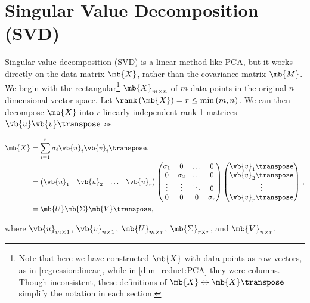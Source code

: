 \section{Singular Value Decomposition (SVD)}
\label{dim_reduct:SVD}

Singular value decomposition (SVD) is a linear method like PCA,
but it works directly on the data matrix $\mb{X}$,
rather than the covariance matrix $\mb{M}$.
We begin with the rectangular\footnote{Note that here we have constructed $\mb{X}$
with data points as row vectors, as in \cref{regression:linear},
while in \cref{dim_reduct:PCA} they were columns.
Though inconsistent, these definitions of $\mb{X} \leftrightarrow \mb{X}\transpose$
simplify the notation in each section.} $\mb{X}_{m \times n}$
of $m$ data points in the original $n$ dimensional vector space.
Let $\rank\left(\mb{X}\right) = r \leq \min\left(m,n\right)$.
We can then decompose $\mb{X}$ into $r$ linearly independent
rank 1 matrices $\vb{u} \vb{v}\transpose$ as

\begin{subequations}\label{eq:SVD}
\begin{align}
\mb{X} &= \sum_{i=1}^{r} \sigma_{i} \vb{u}_{i} \vb{v}_{i}\transpose, \label{eq:SVD:sum} \\
&= \begin{pmatrix}
  \vb{u}_{1} & \vb{u}_{2} & \ldots & \vb{u}_{r}
\end{pmatrix}
\begin{pmatrix}
  \sigma_{1} & 0          & \ldots & 0 \\
  0          & \sigma_{2} & \ldots & 0 \\
  \vdots     & \vdots     & \ddots & 0 \\
  0          & 0          & 0      & \sigma_{r}
\end{pmatrix}
\begin{pmatrix}
  \vb{v}_{1}\transpose \\
  \vb{v}_{2}\transpose \\
  \vdots \\
  \vb{v}_{r}\transpose
\end{pmatrix}\,, \label{eq:SVD:expanded} \\
&= \mb{U} \mb{\Sigma} \mb{V}\transpose, \label{eq:SVD:matrix_form}
\end{align}
\end{subequations}

\noindent where $\vb{u}_{m \times 1}$, $\vb{v}_{n \times 1}$,
$\mb{U}_{m \times r}$, $\mb{\Sigma}_{r \times r}$, and $\mb{V}_{n \times r}$.

